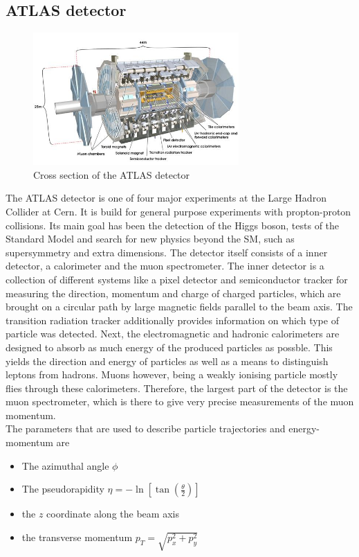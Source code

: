 \documentclass[twoside,        %
               BCOR12mm,       %
               ngerman,english, %
               fleqn,headsepline=false,footsepline=false
              ]{Vorlage/MFPREPORT}
\begin{document}
\subsection{ATLAS detector}
\begin{figure}[ ]
    \centering
    \includegraphics[width=0.7\textwidth]{fig/atlas}
\caption{Cross section of the ATLAS detector \cite{atlas}}
    \label{fig:atlas}
\end{figure}
The ATLAS detector is one of four major experiments at the Large Hadron
Collider at Cern. It is build for general purpose experiments with
propton-proton collisions. Its main goal has been the detection of the Higgs
boson, tests of the Standard Model and search for new physics beyond the SM,
such as supersymmetry and extra dimensions.
The detector itself consists of a inner detector, a calorimeter and the muon
spectrometer. The inner detector is a collection of different systems like a
pixel detector and semiconductor tracker for measuring the direction, momentum
and charge of charged particles, which are brought on a circular path by large
magnetic fields parallel to the beam axis. The transition radiation tracker
additionally provides information on which type of particle was detected. Next,
the electromagnetic and hadronic calorimeters are designed to absorb as much
energy of the produced particles as possble. This yields the direction and
energy of particles as well as a means to distinguish leptons from hadrons. 
Muons however, being a weakly ionising particle mostly flies through these
calorimeters. Therefore, the largest part of the detector is the muon
spectrometer, which is there to give very precise measurements of the muon
momentum.\\
The parameters that are used to describe particle trajectories and
energy-momentum are
\begin{itemize}
    \item The azimuthal angle $\phi$
    \item The pseudorapidity $\eta=-\ln\left[ \tan \left( \frac{\theta}{2}
        \right) \right]$
    \item the $z$ coordinate along the beam axis
    \item the transverse momentum $p_T=\sqrt{p_x^2+p_y^2}$
        
\end{itemize}
\end{document}
